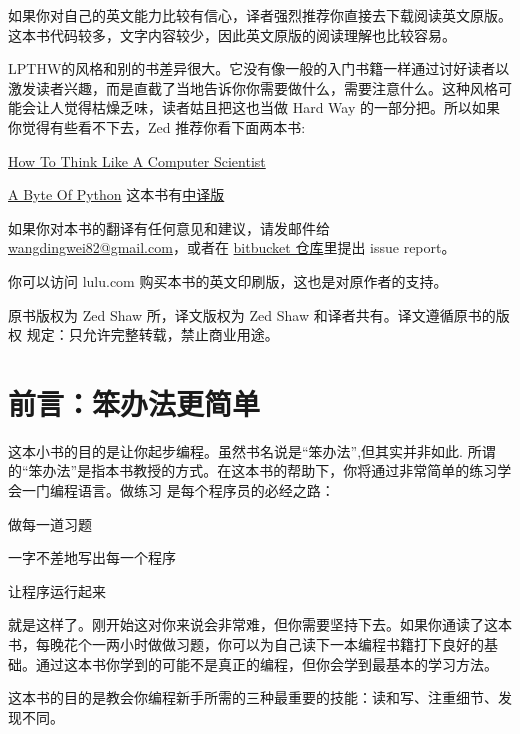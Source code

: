 如果你对自己的英文能力比较有信心，译者强烈推荐你直接去下载阅读英文原版。这本书代码较多，文字内容较少，因此英文原版的阅读理解也比较容易。

LPTHW的风格和别的书差异很大。它没有像一般的入门书籍一样通过讨好读者以激发读者兴趣，而是直截了当地告诉你你需要做什么，需要注意什么。这种风格可能会让人觉得枯燥乏味，读者姑且把这也当做 Hard Way 的一部分把。所以如果你觉得有些看不下去，Zed 推荐你看下面两本书:

\begin{compactitem}
	\item \href{http://www.greenteapress.com/thinkpython/}{How To Think Like A Computer Scientist}
	\item \href{http://www.swaroopch.com/notes/Python}{A Byte Of Python} 这本书有\href{http://linux.chinaitlab.com/manual/python_chinese/}{中译版}
\end{compactitem}

如果你对本书的翻译有任何意见和建议，请发邮件给 \href{wangdingwei82@gmail.com}{wangdingwei82@gmail.com}，或者在 \href{https://bitbucket.org/gastlygem/lpthw/}{bitbucket 仓库}里提出 issue report。

你可以访问 lulu.com 购买本书的英文印刷版，这也是对原作者的支持。

原书版权为 Zed Shaw 所，译文版权为 Zed Shaw 和译者共有。译文遵循原书的版权 规定：只允许完整转载，禁止商业用途。
\section*{前言：笨办法更简单} %
\label{sec:前言_笨办法更简单}
这本小书的目的是让你起步编程。虽然书名说是“笨办法”,但其实并非如此. 所谓的“笨办法”是指本书教授的方式。在这本书的帮助下，你将通过非常简单的练习学会一门编程语言。做练习 是每个程序员的必经之路：

\begin{compactitem}
	\item 做每一道习题
	\item 一字不差地写出每一个程序
	\item 让程序运行起来
\end{compactitem}

就是这样了。刚开始这对你来说会非常难，但你需要坚持下去。如果你通读了这本书，每晚花个一两小时做做习题，你可以为自己读下一本编程书籍打下良好的基础。通过这本书你学到的可能不是真正的编程，但你会学到最基本的学习方法。

这本书的目的是教会你编程新手所需的三种最重要的技能：读和写、注重细节、发现不同。

